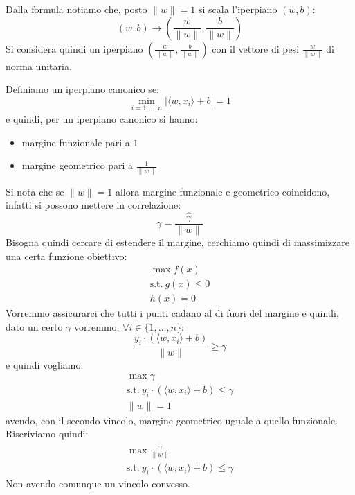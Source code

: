 Dalla formula notiamo che, posto $\| w \| = 1$ si scala l'iperpiano $(w, b)$:
\begin{equation}
    (w, b) \to \left(\frac{w}{\|w\|}, \frac{b}{\| w\|}\right)
\end{equation}
Si considera quindi un iperpiano $\left(\frac{w}{\|w\|}, \frac{b}{\| w\|}\right)$ con il vettore di pesi $\frac{w}{\| w \|}$ di norma unitaria.
\begin{definizione}
     Definiamo un iperpiano canonico se:
     \begin{equation}
          \min_{i = 1, \dots, n} |\langle w, x_i \rangle + b| =  1
     \end{equation}
     e quindi, per un iperpiano canonico si hanno:
     \begin{itemize}
         \item margine funzionale pari a $1$
         \item margine geometrico pari a $\frac{1}{\| w \|}$
     \end{itemize}
\end{definizione}
Si nota che se $\| w \| = 1$ allora margine funzionale e geometrico coincidono, infatti si possono mettere in correlazione:
\begin{equation}
    \gamma = \frac{\hat{\gamma}}{\| w \|}
\end{equation}
Bisogna quindi cercare di estendere il margine, cerchiamo quindi di massimizzare una certa funzione obiettivo:
\begin{equation*}
    \begin{aligned}
        \max f(x) \\ \text{s.t.} \ g(x) \leq 0 \\ h(x) = 0
     \end{aligned}
\end{equation*}
Vorremmo assicurarci che tutti i punti cadano al di fuori del margine e quindi, dato un certo $\gamma$ vorremmo, $\forall i \in \{1, \dots, n\}$:
\begin{equation}
    \frac{y_i \cdot (\langle w, x_i \rangle + b)}{\| w \|} \geq \gamma
\end{equation}
e quindi vogliamo:
\begin{equation*}
    \begin{aligned}
        \max \gamma \\ \text{s.t.} \ y_i \cdot (\langle w, x_i \rangle + b) \leq \gamma \\ \| w \| = 1
     \end{aligned}
\end{equation*}
avendo, con il secondo vincolo, margine geometrico uguale a quello funzionale. Riscriviamo quindi:
\begin{equation*}
    \begin{aligned}
        \max \frac{\hat{\gamma}}{\|w\|} \\ \text{s.t.} \ y_i \cdot (\langle w, x_i \rangle + b) \leq \gamma 
    \end{aligned}
\end{equation*}
Non avendo comunque un vincolo convesso.

